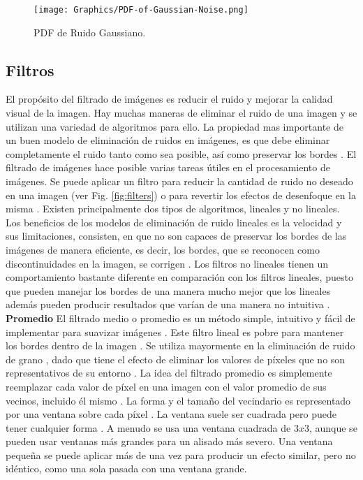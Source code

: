 \begin{figure}[h!]
    \centering
    \texttt{[image: Graphics/PDF-of-Gaussian-Noise.png]}
    \caption{PDF de Ruido Gaussiano.}
    \label{fig:PDFGaussianNoise}
\end{figure}

\subsection{Filtros}

El propósito del filtrado de imágenes es reducir el ruido y mejorar la calidad visual de la imagen. Hay muchas maneras de eliminar el ruido de una imagen y se utilizan una variedad de algoritmos \cite{MandarMeghana, PawanManojSumitAshok} para ello. La propiedad mas importante de un buen modelo de eliminación de ruidos en imágenes, es que debe eliminar completamente el ruido tanto como sea posible, así como preservar los bordes \cite{PawanManojSumitAshok}. El filtrado de imágenes hace posible varias tareas útiles en el procesamiento de imágenes. Se puede aplicar un filtro para reducir la cantidad de ruido no deseado en una imagen (ver Fig. \ref{fig:filters}) o para revertir los efectos de desenfoque en la misma \cite{RuchikaGaurav}. Existen principalmente dos tipos de algoritmos, lineales y no lineales. Los beneficios de los modelos de eliminación de ruido lineales es la velocidad y sus limitaciones, consisten, en que no son capaces de preservar los bordes de las imágenes de manera eficiente, es decir, los bordes, que se reconocen como discontinuidades en la imagen, se corrigen \cite{PawanManojSumitAshok}. Los filtros no lineales tienen un comportamiento bastante diferente en comparación con los filtros lineales, puesto que pueden manejar los bordes de una manera mucho mejor que los lineales además pueden producir resultados que varían de una manera no intuitiva \cite{RuchikaGaurav}.\\

\textbf{Promedio}
El filtrado medio o promedio es un método simple, intuitivo y fácil de implementar para suavizar imágenes \cite{RajeshUday}. Este filtro lineal es pobre para mantener los bordes dentro de la imagen \cite{JamesYixinStephen}. Se utiliza mayormente en la eliminación de ruido de grano \cite{PawanManojSumitAshok}, dado que tiene el efecto de eliminar los valores de píxeles que no son representativos de su entorno \cite{RajeshUday}. La idea del filtrado promedio es simplemente reemplazar cada valor de píxel en una imagen con el valor promedio de sus vecinos, incluido él mismo \cite{RajeshUday}. La forma y el tamaño del vecindario es representado por una ventana sobre cada píxel \cite{PawanManojSumitAshok}. La ventana suele ser cuadrada pero puede tener cualquier forma \cite{MandarMeghana}. A menudo se usa una ventana cuadrada de $3 x 3$, aunque se pueden usar ventanas más grandes para un alisado más severo. Una ventana pequeña se puede aplicar más de una vez para producir un efecto similar, pero no idéntico, como una sola pasada con una ventana grande\cite{RajeshUday}.\\


